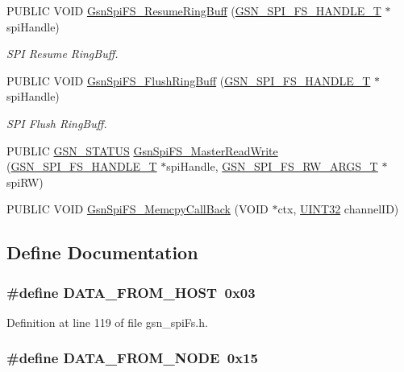 \begin{DoxyCompactItemize}
PUBLIC VOID \hyperlink{a00655_ga7a8f0b4b3c8a79b1c9158aac0bbe0879}{GsnSpiFS\_\-ResumeRingBuff} (\hyperlink{a00234}{GSN\_\-SPI\_\-FS\_\-HANDLE\_\-T} $\ast$spiHandle)
\begin{DoxyCompactList}\small\item\em SPI Resume RingBuff. \end{DoxyCompactList}\item 
PUBLIC VOID \hyperlink{a00655_gaf65c6cdbb2571726a4cde5afab94a6fa}{GsnSpiFS\_\-FlushRingBuff} (\hyperlink{a00234}{GSN\_\-SPI\_\-FS\_\-HANDLE\_\-T} $\ast$spiHandle)
\begin{DoxyCompactList}\small\item\em SPI Flush RingBuff. \end{DoxyCompactList}\item 
PUBLIC \hyperlink{a00660_gada5951904ac6110b1fa95e51a9ddc217}{GSN\_\-STATUS} \hyperlink{a00589_a7c581da0c90782d49098354999860c93}{GsnSpiFS\_\-MasterReadWrite} (\hyperlink{a00234}{GSN\_\-SPI\_\-FS\_\-HANDLE\_\-T} $\ast$spiHandle, \hyperlink{a00235}{GSN\_\-SPI\_\-FS\_\-RW\_\-ARGS\_\-T} $\ast$spiRW)
\item 
PUBLIC VOID \hyperlink{a00589_affb42df9a03663a899472f60dd75d52e}{GsnSpiFS\_\-MemcpyCallBack} (VOID $\ast$ctx, \hyperlink{a00660_gae1e6edbbc26d6fbc71a90190d0266018}{UINT32} channelID)
\end{DoxyCompactItemize}


\subsection{Define Documentation}
\hypertarget{a00589_af6a3ab9ad7679428b8a2f90378d257c1}{
\subsubsection[{DATA\_\-FROM\_\-HOST}]{\setlength{\rightskip}{0pt plus 5cm}\#define DATA\_\-FROM\_\-HOST~0x03}}
\label{a00589_af6a3ab9ad7679428b8a2f90378d257c1}


Definition at line 119 of file gsn\_\-spiFs.h.

\hypertarget{a00589_a86f2b9e66b5ab567ed3ed421c8f5ec85}{
\subsubsection[{DATA\_\-FROM\_\-NODE}]{\setlength{\rightskip}{0pt plus 5cm}\#define DATA\_\-FROM\_\-NODE~0x15}}
\label{a00589_a86f2b9e66b5ab567ed3ed421c8f5ec85}


